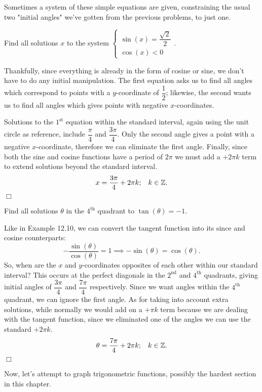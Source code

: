 \documentclass[lang=en,11pt]{elegantbook}
\begin{document}
Sometimes a system of these simple equations are given, constraining the usual two "initial angles" we've gotten from the previous problems, to just one.
\begin{example}
Find all solutions $x$ to the system $\begin{cases} \sin(x)=\dfrac{\sqrt{2}}{2} \\ \cos(x)<0\end{cases}$.
\end{example}
\begin{solution}
Thankfully, since everything is already in the form of cosine or sine, we don’t have to do any initial manipulation. The first equation asks us to find all angles which correspond to points with a $y$-coordinate of $\dfrac{1}{2}$; likewise, the second wants us to find all angles which gives points with negative $x$-coordinates. 

Solutions to the $1^{\text{st}}$ equation within the standard interval, again using the unit circle as reference, include $\dfrac{\pi}{4}$ and $\dfrac{3\pi}{4}$. Only the second angle gives a point with a negative $x$-coordinate, therefore we can eliminate the first angle. Finally, since both the sine and cosine functions have a period of $2\pi$ we must add a $+2\pi k$ term to extend solutions beyond the standard interval. $$x=\dfrac{3\pi}{4}+2\pi k;\hspace{3mm}k\in\mathbb{Z}.$$ $\Box$
\end{solution}
\begin{example}
Find all solutions $\theta$ in the $4^\text{th}$ quadrant to $\tan(\theta)=-1.$
\end{example}
\begin{solution}
Like in Example 12.10, we can convert the tangent function into its since and cosine counterparts: $$-\dfrac{\sin(\theta)}{\cos(\theta)}=1 \implies -\sin(\theta)=\cos(\theta).$$
So, when are the $x$ and $y$-coordinates opposites of each other within our standard interval? This occurs at the perfect diagonals in the $2^\text{nd}$ and $4^\text{th}$ quadrants, giving initial angles of $\dfrac{3\pi}{4}$ and $\dfrac{7\pi}{4}$ respectively. Since we want angles within the $4^\text{th}$ quadrant, we can ignore the first angle. As for taking into account extra solutions, while normally we would add on a $+\pi k$ term because we are dealing with the tangent function, since we eliminated one of the angles we can use the standard $+2\pi k$. $$\theta=\dfrac{7\pi}{4}+2\pi k;\hspace{3mm} k\in\mathbb{Z}.$$ $\Box$
\end{solution}
Now, let's attempt to graph trigonometric functions, possibly the hardest section in this chapter.
\end{document}
